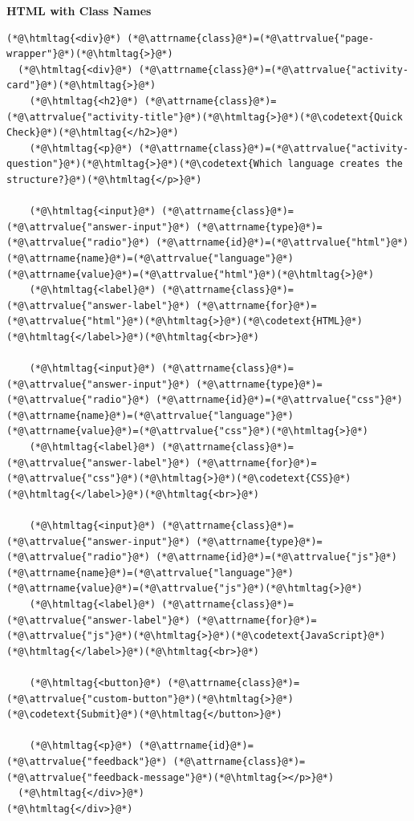 \documentclass{article}
\begin{document}
\noindent
\begin{minipage}[t]{0.48\textwidth}
  \textbf{\Bitter\textcolor{naranja}{HTML with Class Names}}

  \vspace{0.15cm}

  \begin{lstlisting}
(*@\htmltag{<div}@*) (*@\attrname{class}@*)=(*@\attrvalue{"page-wrapper"}@*)(*@\htmltag{>}@*)
  (*@\htmltag{<div}@*) (*@\attrname{class}@*)=(*@\attrvalue{"activity-card"}@*)(*@\htmltag{>}@*)
    (*@\htmltag{<h2}@*) (*@\attrname{class}@*)=(*@\attrvalue{"activity-title"}@*)(*@\htmltag{>}@*)(*@\codetext{Quick Check}@*)(*@\htmltag{</h2>}@*)
    (*@\htmltag{<p}@*) (*@\attrname{class}@*)=(*@\attrvalue{"activity-question"}@*)(*@\htmltag{>}@*)(*@\codetext{Which language creates the structure?}@*)(*@\htmltag{</p>}@*)

    (*@\htmltag{<input}@*) (*@\attrname{class}@*)=(*@\attrvalue{"answer-input"}@*) (*@\attrname{type}@*)=(*@\attrvalue{"radio"}@*) (*@\attrname{id}@*)=(*@\attrvalue{"html"}@*) (*@\attrname{name}@*)=(*@\attrvalue{"language"}@*) (*@\attrname{value}@*)=(*@\attrvalue{"html"}@*)(*@\htmltag{>}@*)
    (*@\htmltag{<label}@*) (*@\attrname{class}@*)=(*@\attrvalue{"answer-label"}@*) (*@\attrname{for}@*)=(*@\attrvalue{"html"}@*)(*@\htmltag{>}@*)(*@\codetext{HTML}@*)(*@\htmltag{</label>}@*)(*@\htmltag{<br>}@*)

    (*@\htmltag{<input}@*) (*@\attrname{class}@*)=(*@\attrvalue{"answer-input"}@*) (*@\attrname{type}@*)=(*@\attrvalue{"radio"}@*) (*@\attrname{id}@*)=(*@\attrvalue{"css"}@*) (*@\attrname{name}@*)=(*@\attrvalue{"language"}@*) (*@\attrname{value}@*)=(*@\attrvalue{"css"}@*)(*@\htmltag{>}@*)
    (*@\htmltag{<label}@*) (*@\attrname{class}@*)=(*@\attrvalue{"answer-label"}@*) (*@\attrname{for}@*)=(*@\attrvalue{"css"}@*)(*@\htmltag{>}@*)(*@\codetext{CSS}@*)(*@\htmltag{</label>}@*)(*@\htmltag{<br>}@*)

    (*@\htmltag{<input}@*) (*@\attrname{class}@*)=(*@\attrvalue{"answer-input"}@*) (*@\attrname{type}@*)=(*@\attrvalue{"radio"}@*) (*@\attrname{id}@*)=(*@\attrvalue{"js"}@*) (*@\attrname{name}@*)=(*@\attrvalue{"language"}@*) (*@\attrname{value}@*)=(*@\attrvalue{"js"}@*)(*@\htmltag{>}@*)
    (*@\htmltag{<label}@*) (*@\attrname{class}@*)=(*@\attrvalue{"answer-label"}@*) (*@\attrname{for}@*)=(*@\attrvalue{"js"}@*)(*@\htmltag{>}@*)(*@\codetext{JavaScript}@*)(*@\htmltag{</label>}@*)(*@\htmltag{<br>}@*)

    (*@\htmltag{<button}@*) (*@\attrname{class}@*)=(*@\attrvalue{"custom-button"}@*)(*@\htmltag{>}@*)(*@\codetext{Submit}@*)(*@\htmltag{</button>}@*)

    (*@\htmltag{<p}@*) (*@\attrname{id}@*)=(*@\attrvalue{"feedback"}@*) (*@\attrname{class}@*)=(*@\attrvalue{"feedback-message"}@*)(*@\htmltag{></p>}@*)
  (*@\htmltag{</div>}@*)
(*@\htmltag{</div>}@*)
\end{lstlisting}

\end{minipage}
\end{document}
